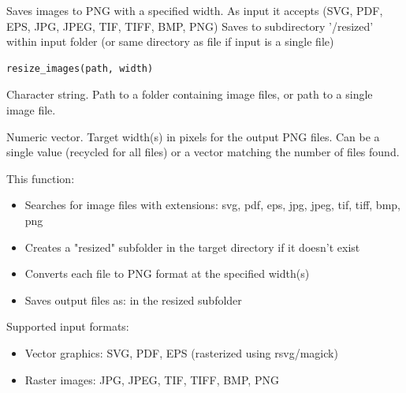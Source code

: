 \documentclass[a4paper]{book}
\begin{document}
%
\begin{Description}
Saves images to PNG with a specified width. As input it accepts (SVG, PDF, EPS, JPG, JPEG, TIF, TIFF, BMP, PNG)
Saves to subdirectory '/resized' within input folder (or same directory as file if input is a single file)
\end{Description}
%
\begin{Usage}
\begin{verbatim}
resize_images(path, width)
\end{verbatim}
\end{Usage}
%
\begin{Arguments}
\begin{ldescription}
\item[\code{path}] Character string. Path to a folder containing image files, or path to a single image file.

\item[\code{width}] Numeric vector. Target width(s) in pixels for the output PNG files.
Can be a single value (recycled for all files) or a vector matching the number
of files found.
\end{ldescription}
\end{Arguments}
%
\begin{Details}
This function:
\begin{itemize}

\item{} Searches for image files with extensions: svg, pdf, eps, jpg, jpeg, tif, tiff, bmp, png
\item{} Creates a "resized" subfolder in the target directory if it doesn't exist
\item{} Converts each file to PNG format at the specified width(s)
\item{} Saves output files as:  in the resized subfolder

\end{itemize}


Supported input formats:
\begin{itemize}

\item{} Vector graphics: SVG, PDF, EPS (rasterized using rsvg/magick)
\item{} Raster images: JPG, JPEG, TIF, TIFF, BMP, PNG

\end{itemize}

\end{Details}
\end{document}
